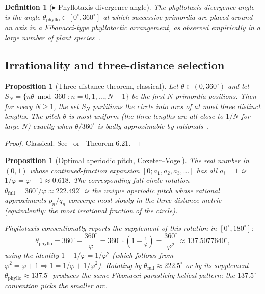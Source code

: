 \documentclass[12pt]{article}
\newtheorem{proposition}[theorem]{Proposition}
\newtheorem{definition}[theorem]{Definition}
\newcommand{\phig}{\varphi}
\begin{document}
\begin{definition}[$\blacktriangleright$ Phyllotaxis divergence angle]\label{def:D1}
The \emph{phyllotaxis divergence angle} is the angle
$\theta_{\mathrm{phyllo}} \in [0^{\circ}, 360^{\circ}]$ at which
successive primordia are placed around an axis in a Fibonacci-type
phyllotactic arrangement, as observed empirically in a large number
of plant species~\cite{Jean1994}.
\end{definition}

\subsection{Irrationality and three-distance selection}

\begin{proposition}[Three-distance theorem, classical]\label{prop:three-dist}
Let $\theta \in (0, 360^{\circ})$ and let $S_N =
\{n\theta \bmod 360^{\circ} : n = 0, 1, \ldots, N-1\}$ be the first
$N$ primordia positions. Then for every $N \ge 1$, the set $S_N$
partitions the circle into arcs of at most three distinct lengths.
The pitch $\theta$ is \emph{most uniform} (the three lengths are all
close to $1/N$ for large $N$) exactly when $\theta/360^{\circ}$ is
badly approximable by rationals~\cite{Sos1958,Swierczkowski1958}.
\end{proposition}

\begin{proof}
Classical. See~\cite[\S 1.3]{Jean1994} or~\cite{GrahamKnuthPatashnik}
Theorem 6.21.
\end{proof}

\begin{proposition}[Optimal aperiodic pitch, Coxeter--Vogel]\label{prop:coxeter-vogel}
The real number in $(0, 1)$ whose continued-fraction expansion
$[0; a_1, a_2, a_3, \ldots]$ has all $a_i = 1$ is $1/\phig =
\phig - 1 \approx 0.618$. The corresponding full-circle rotation
$\theta_{\mathrm{full}} = 360^{\circ}/\phig \approx 222.492^{\circ}$
is the unique aperiodic pitch whose rational approximants
$p_n/q_n$ converge most slowly in the three-distance metric
(equivalently: the most irrational fraction of the circle).

Phyllotaxis conventionally reports the \emph{supplement} of this
rotation in $[0^{\circ}, 180^{\circ}]$:
\begin{equation}\label{eq:gold-value}
    \theta_{\mathrm{phyllo}}
    = 360^{\circ} - \frac{360^{\circ}}{\phig}
    = 360^{\circ}\cdot\!\left(1 - \tfrac{1}{\phig}\right)
    = \frac{360^{\circ}}{\phig^{2}}
    \approx 137.5077640^{\circ},
\end{equation}
using the identity $1 - 1/\phig = 1/\phig^2$ (which follows from
$\phig^2 = \phig + 1 \Rightarrow 1 = 1/\phig + 1/\phig^2$).
Rotating by $\theta_{\mathrm{full}} \approx 222.5^{\circ}$ or by
its supplement $\theta_{\mathrm{phyllo}} \approx 137.5^{\circ}$
produces the same Fibonacci-parastichy helical pattern; the
$137.5^{\circ}$ convention picks the smaller arc.
\end{proposition}
\end{document}
